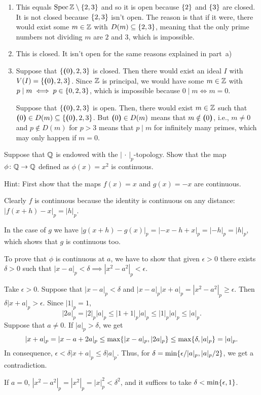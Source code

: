 \begin{solution}
    \begin{enumerate}[\rm a)]
        \item This equals $\operatorname{Spec}\mathbb{Z}\setminus\{2,3\}$ and so it is open because $\{2\}$ and $\{3\}$ are closed. It is not closed because $\{2,3\}$ isn't open. The reason is that if it were, there would exist some $m\in\mathbb{Z}$ with $D(m)\subseteq\{2,3\}$, meaning that the only prime numbers not dividing $m$ are $2$ and $3$, which is impossible.

        \item This is closed. It isn't open for the same reasons explained in part~a)

        \item Suppose that $\{\textrm{\boldmath$($}0\textrm{\boldmath$)$},2,3\}$ is closed. Then there would exist an ideal $I$ with $V(I)=\{\textrm{\boldmath$($}0\textrm{\boldmath$)$},2,3\}$. Since $\mathbb{Z}$ is principal, we would have some $m\in\mathbb{Z}$ with $p\mid m\iff p\in\{0,2,3\}$, which is impossible because $0\mid m\iff m=0$.

        Suppose that $\{\textrm{\boldmath$($}0\textrm{\boldmath$)$},2,3\}$ is open. Then, there would exist $m\in\mathbb{Z}$ such that $\textrm{\boldmath$($}0\textrm{\boldmath$)$}\in D(m)\subseteq\{\textrm{\boldmath$($}0\textrm{\boldmath$)$},2,3\}$. But $\textrm{\boldmath$($}0\textrm{\boldmath$)$}\in D(m)$ means that $m\notin\textrm{\boldmath$($}0\textrm{\boldmath$)$}$, i.e., $m\ne0$ and $p\notin D(m)$ for $p>3$ means that $p\mid m$ for infinitely many primes, which may only happen if $m=0$.
    \end{enumerate}
\end{solution}

\begin{exr}
    Suppose that\/ $\mathbb{Q}$ is endowed with the\/ $|\,\cdot\,|_p$-topology. Show that the map\/ $\phi\colon\mathbb{Q}\to\mathbb{Q}$ defined as\/ $\phi(x)=x^2$ is continuous.
    
    \textrm{\rm Hint: First show that the maps $f(x)=x$ and $g(x)=-x$ are continuous.}
\end{exr}

\begin{solution}
    Clearly $f$ is continuous because the identity is continuous on any distance: $|f(x+h) - x|_p = |h|_p$.

    In the case of $g$ we have $|g(x+h)-g(x)|_p = |-x-h+x|_p=|-h|_p=|h|_p$, which shows that $g$ is continuous too.

    To prove that $\phi$ is continuous at $a$, we have to show that given $\epsilon>0$ there exists $\delta>0$ such that $|x-a|_p<\delta\implies|x^2-a^2|_p<\epsilon$.

    Take $\epsilon>0$. Suppose that $|x-a|_p<\delta$ and $|x-a|_p|x+a|_p=|x^2-a^2|_p\ge\epsilon$. Then $\delta|x+a|_p>\epsilon$. Since $|1|_p=1$,
    $$
        |2a|_p=|2|_p|a|_p\le|1+1|_p|a|_p\le|1|_p|a|_p\le|a|_p.
    $$
    Suppose that $a\ne0$. If $|a|_p>\delta$, we get
    $$
        |x+a|_p=|x-a + 2a|_p\leq\max\{|x-a|_p,|2a|_p\}
            \le \max\{\delta,|a|_p\} = |a|_p.
    $$
    In consequence, $\epsilon < \delta|x+a|_p\le\delta|a|_p$. Thus, for $\delta=\min\{\epsilon/|a|_p,|a|_p/2\}$, we get a contradiction.

    If $a=0$, $|x^2-a^2|_p=|x^2|_p=|x|_p^2<\delta^2$, and it suffices to take $\delta<\min\{\epsilon,1\}$.
\end{solution}

